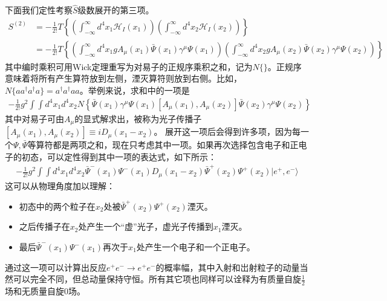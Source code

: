 下面我们定性考察$\hat{S}$级数展开的第三项。
\begin{align}\label{equ9.75}
S^{(2)}&=-\frac{1}{2!}T\left\{ \left( \int_{-\infty}^\infty d^4x_1\mathscr{H}_I(x_1)\right)\left( \int_{-\infty}^\infty d^4x_2\mathscr{H}_I(x_2)\right)\right\}\nonumber\\
&=-\frac{1}{2!}T\left\{ \left( \int_{-\infty}^\infty d^4x_1gA_\mu(x_1)\bar{\Psi}(x_1)\gamma^\mu\Psi(x_1)\right)\left( \int_{-\infty}^\infty d^4x_2gA_\mu(x_2)\bar{\Psi}(x_2)\gamma^\mu\Psi(x_2)\right)\right\}
\end{align}
其中编时乘积可用Wick定理重写为对易子的正规序乘积之和，记为$N\{\}$。正规序意味着将所有产生算符放到左侧，湮灭算符则放到右侧。比如，$N\{aa^\dag a^\dag a\}=a^\dag a^\dag aa$。举例来说，求和中的一项是
\begin{gather*}
-\frac{1}{2!}g^2\int\int d^4x_1 d^4x_2 N\left\{ \bar{\Psi}(x_1)\gamma^\mu\Psi(x_1)[A_\mu(x_1),A_\mu(x_2)]\bar{\Psi}(x_2)\gamma^\mu\Psi(x_2)\right\}
\end{gather*}
其中对易子可由$A_\mu$的显式解求出，被称为光子传播子$[A_\mu(x_1),A_\mu(x_2)]\equiv iD_\mu(x_1-x_2)$。
展开这一项后会得到许多项，因为每一个$\Psi,\bar{\Psi}$等算符都是两项之和，现在只考虑其中一项。如果再次选择包含电子和正电子的初态，可以定性得到其中一项的表达式，如下所示：
\begin{align}\label{equ9.76}
-\frac{1}{2!}g^2\int\int d^4x_1 d^4x_2 \bar{\Psi}^-(x_1)\Psi^-(x_1)D_\mu(x_1-x_2)\bar{\Psi}^+(x_2)\Psi^+(x_2)|e^+,e^-\rangle
\end{align}
这可以从物理角度加以理解：
\begin{itemize}
\item 初态中的两个粒子在$x_2$处被$\bar{\Psi}^+(x_2)\Psi^+(x_2)$湮灭。
\item 之后传播子在$x_2$处产生一个“虚”光子，虚光子传播到$x_1$湮灭。
\item 最后$\bar{\Psi}^-(x_1)\Psi^-(x_1)$再次于$x_1$处产生一个电子和一个正电子。
\end{itemize}
通过这一项可以计算出反应$e^+e^-\to e^+ e^-$的概率幅，其中入射和岀射粒子的动量当然可以完全不同，但总动量保持守恒。所有其它项也同样可以诠释为有质量自旋$\frac{1}{2}$场和无质量自旋$0$场。
